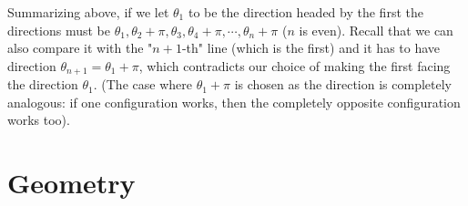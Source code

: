 \documentclass[11pt,a4paper]{article}
\begin{document}
\begin{itemize}
Summarizing above, if we let $\theta_1$ to be the direction headed by the first \animal
the directions must be $\theta_1, \theta_2+\pi, \theta_3, \theta_4+\pi, \cdots , \theta_n+\pi$ ($n$ is even). 
Recall that we can also compare it with the "$n+1$-th" line (which is the first) and it has to have direction $\theta_{n+1}=\theta_1 +\pi$, 
which contradicts our choice of making the first \animal facing the direction $\theta_1$. 
(The case where $\theta_1+\pi$ is chosen as the direction is completely analogous: if one configuration works, then the completely opposite configuration works too). 
\end{itemize}

\newpage
\section{Geometry}
\end{document}
